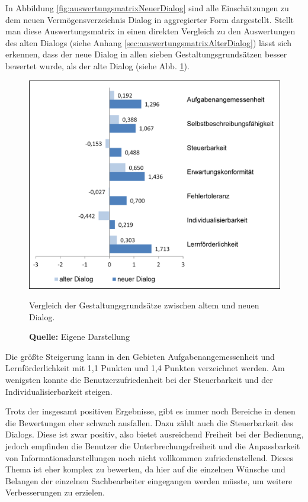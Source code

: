 In Abbildung \ref{fig:auswertungsmatrixNeuerDialog} sind alle Einschätzungen zu dem neuen Vermögensverzeichnis Dialog in aggregierter Form dargestellt. Stellt man diese Auswertungsmatrix in einen direkten Vergleich zu den Auswertungen des alten Dialogs (siehe Anhang \ref{sec:auswertungsmatrixAlterDialog}) lässt sich erkennen, dass der neue Dialog in allen sieben Gestaltungsgrundsätzen besser bewertet wurde, als der alte Dialog (siehe Abb. \ref{fig:vergleichBalkendiagramm}). 
\begin{figure}[H]
  \centering
  \includegraphics[scale=0.88]{img/ISO9241-10_Vergleich_Balkendiagramm.PNG}
  \caption{Vergleich der Gestaltungsgrundsätze zwischen altem und neuen Dialog.}
  \caption*{\textbf{Quelle:} Eigene Darstellung}
  \label{fig:vergleichBalkendiagramm}
\end{figure}
Die größte Steigerung kann in den Gebieten Aufgabenangemessenheit und Lernförderlichkeit mit 1,1 Punkten und 1,4 Punkten verzeichnet werden. Am wenigsten konnte die Benutzerzufriedenheit bei der Steuerbarkeit und der Individualisierbarkeit steigen. 

Trotz der insgesamt positiven Ergebnisse, gibt es immer noch Bereiche in denen die Bewertungen eher schwach ausfallen. Dazu zählt auch die Steuerbarkeit des Dialogs. Diese ist zwar positiv, also bietet ausreichend Freiheit bei der Bedienung, jedoch empfinden die Benutzer die Unterbrechungsfreiheit und die Anpassbarkeit von Informationsdarstellungen noch nicht vollkommen zufriedenstellend. Dieses Thema ist eher komplex zu bewerten, da hier auf die einzelnen Wünsche und Belangen der einzelnen Sachbearbeiter eingegangen werden müsste, um weitere Verbesserungen zu erzielen.

